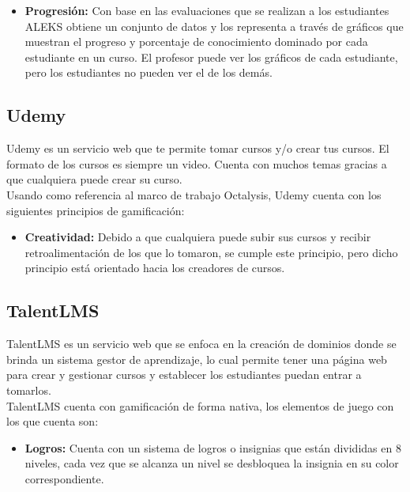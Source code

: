 \begin{multicols*}{2}
\begin{itemize}
        \item {\bf Progresión:} Con base en las evaluaciones que se realizan a los
            estudiantes ALEKS obtiene un conjunto de datos y los representa a través
            de gráficos que muestran el progreso y porcentaje de conocimiento
            dominado por cada estudiante en un curso. El profesor puede ver los
            gráficos de cada estudiante, pero los estudiantes no pueden ver el de
            los demás.
    \end{itemize}


\vfill\null
\columnbreak
\subsection{Udemy}

 Udemy \cite{PagUdemy} es un servicio web que te permite tomar cursos y/o crear tus
 cursos. El formato de los cursos es siempre un video. Cuenta con muchos temas
 gracias a que cualquiera puede crear su curso.\\

    \noindent Usando como referencia al marco de trabajo Octalysis,
    Udemy cuenta con los siguientes principios de gamificación:

    \begin{itemize}
        \item {\bf Creatividad:} Debido a que cualquiera puede subir
        sus cursos y recibir retroalimentación de los que lo tomaron,
        se cumple este principio, pero dicho principio está orientado
        hacia los creadores de cursos.
    \end{itemize}

\subsection{TalentLMS}

 TalentLMS \cite{PagTalentLMS} es un servicio web que se enfoca en la creación de dominios
 donde se brinda un sistema gestor de aprendizaje, lo cual permite tener una página web para
 crear y gestionar cursos y establecer los estudiantes puedan entrar a tomarlos.\\

    \noindent TalentLMS cuenta con gamificación de forma nativa,
    los elementos de juego con los que cuenta son:

    \begin{itemize}

        \item {\bf Logros:} Cuenta con un sistema de logros o insignias que
            están divididas en 8 niveles, cada vez que se alcanza un nivel se
            desbloquea la insignia en su color correspondiente.


\end{itemize}
\end{multicols*}
